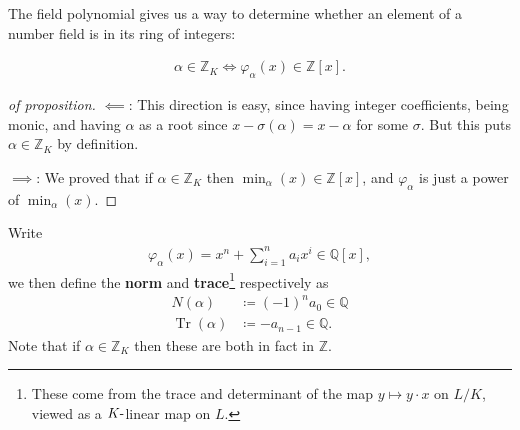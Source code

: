 \begin{remark}

The field polynomial gives us a way to determine whether an element of a
number field is in its ring of integers:

\end{remark}

\begin{proposition}

\begin{align*}
\alpha\in {\mathbb{Z}}_K \iff \varphi_{ \alpha}(x) \in {\mathbb{Z}}[x]
.\end{align*}

\end{proposition}

\begin{proof}[of proposition]

\(\impliedby\): This direction is easy, since having integer
coefficients, being monic, and having \(\alpha\) as a root since
\(x - \sigma( \alpha) = x - \alpha\) for some \(\sigma\). But this puts
\(\alpha \in {\mathbb{Z}}_K\) by definition.

\(\implies\): We proved that if \(\alpha\in {\mathbb{Z}}_K\) then
\(\min_ \alpha(x) \in {\mathbb{Z}}[x]\), and \(\varphi_{ \alpha}\) is
just a power of \(\min_ \alpha(x)\).

\end{proof}

\begin{definition}

Write
\begin{align*}
\varphi_{ \alpha} (x) = x^n + \sum_{i=1}^n a_i x^i \in {\mathbb{Q}}[x]
,\end{align*}
we then define the \textbf{norm} and \textbf{trace}\footnote{These come
  from the trace and determinant of the map \(y \mapsto y\cdot x\) on
  \(L/K\), viewed as a \(K{\hbox{-}}\)linear map on \(L\).} respectively
as
\begin{align*}
N( \alpha) &\coloneqq(-1)^n a_0 \in {\mathbb{Q}}\\
\operatorname{Tr}( \alpha) &\coloneqq-a_{n-1} \in {\mathbb{Q}}
.\end{align*}
Note that if \(\alpha \in {\mathbb{Z}}_K\) then these are both in fact
in \({\mathbb{Z}}\).

\end{definition}

